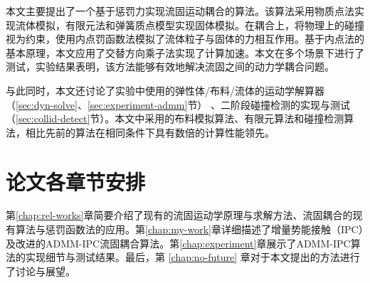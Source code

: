 本文主要提出了一个基于惩罚力实现流固运动耦合的算法。该算法采用物质点法实现流体模拟，有限元法和弹簧质点模型实现固体模拟。在耦合上，将物理上的碰撞视为约束，使用内点罚函数法模拟了流体粒子与固体的力相互作用。基于内点法的基本原理，本文应用了交替方向乘子法实现了计算加速。本文在多个场景下进行了测试，实验结果表明，该方法能够有效地解决流固之间的动力学耦合问题。

与此同时，本文还讨论了实验中使用的弹性体/布料/流体的运动学解算器（\ref{sec:dyn-solve}、\ref{sec:experiment-admm}节） 、二阶段碰撞检测的实现与测试（\ref{sec:collid-detect}节）。本文中采用的布料模拟算法、有限元算法和碰撞检测算法，相比先前的算法在相同条件下具有数倍的计算性能领先。

\section{论文各章节安排}

第\ref{chap:rel-works}章简要介绍了现有的流固运动学原理与求解方法、流固耦合的现有算法与惩罚函数法的应用。第\ref{chap:my-work}章详细描述了增量势能接触（IPC）及改进的ADMM-IPC流固耦合算法。第\ref{chap:experiment}章展示了ADMM-IPC算法的实现细节与测试结果。最后，第 \ref{chap:no-future} 章对于本文提出的方法进行了讨论与展望。
